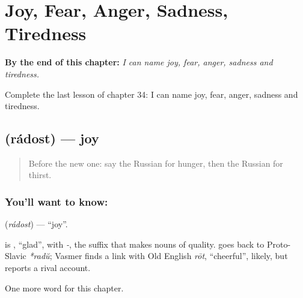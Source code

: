 
\chapter{Joy, Fear, Anger, Sadness, Tiredness}
\label{ch:ru-joy-fear-anger-sadness-tiredness}

\begin{chapteropening}
\textbf{By the end of this chapter:} \emph{I can name joy, fear, anger, sadness and tiredness.}

Complete the last lesson of chapter 34: I can name joy, fear, anger, sadness and tiredness.
\end{chapteropening}

\section[\texorpdfstring{\ru{радость} (rádost)}{радость (rádost)}]{ (rádost) — joy}

\label{lesson:RU-C34-joy}



\begin{quote}
Before the new one: say the Russian for hunger, then the Russian for thirst.
\end{quote}

\subsection*{You'll want to know: }
\textbf{} (\emph{rádost}) — \textquotedblleft{}joy\textquotedblright{}.

\begin{cousinweb}
\textbf{} is \emph{}, \textquotedblleft{}glad\textquotedblright{}, with \emph{-}, the suffix that makes nouns of quality. \emph{} goes back to Proto-Slavic \emph{*radŭ}; Vasmer finds a link with Old English \emph{rōt}, \textquotedblleft{}cheerful\textquotedblright{}, likely, but reports a rival account.
\end{cousinweb}

\begin{grammarlens}[title={What you've built}]
One more word for this chapter.
\end{grammarlens}

